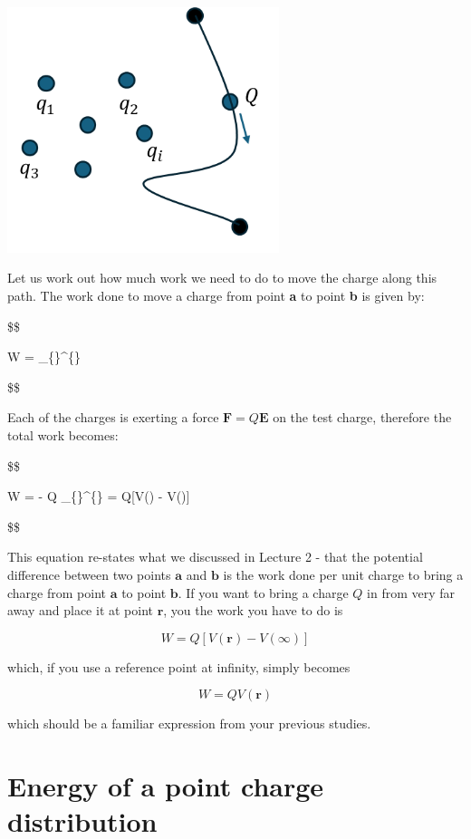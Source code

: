 \documentclass[
  letterpaper,
  DIV=11,
  numbers=noendperiod]{scrreprt}
\begin{document}
\includegraphics[width=3.125in,height=\textheight]{Figures/workdone_charge.png}

Let us work out how much work we need to do to move the charge along
this path. The work done to move a charge from point \textbf{a} to point
\textbf{b} is given by:

\$\$

W = \int\_\{\}\^{}\{\}
 \cdot {}  

\$\$

Each of the charges is exerting a force
\(\mathrm{\mathbf{F}}= Q \mathrm{\mathbf{E}}\) on the test charge,
therefore the total work becomes:

\$\$

W = - Q \int\_\{\}\^{}\{\}
 \cdot {}  =
Q{[}V() - V(){]}

\$\$

This equation re-states what we discussed in Lecture 2 - that the
potential difference between two points \(\mathrm{\mathbf{a}}\) and
\(\mathrm{\mathbf{b}}\) is the work done per unit charge to bring a
charge from point \(\mathrm{\mathbf{a}}\) to point
\(\mathrm{\mathbf{b}}\). If you want to bring a charge \(Q\) in from
very far away and place it at point \(\mathrm{\mathbf{r}}\), you the
work you have to do is

\[W = Q[V(\mathrm{\mathbf{r}}) - V(\infty)]\]

which, if you use a reference point at infinity, simply becomes

\[W = Q V(\mathrm{\mathbf{r}})\]

which should be a familiar expression from your previous studies.

\section{Energy of a point charge
distribution}\label{energy-of-a-point-charge-distribution}
\end{document}
